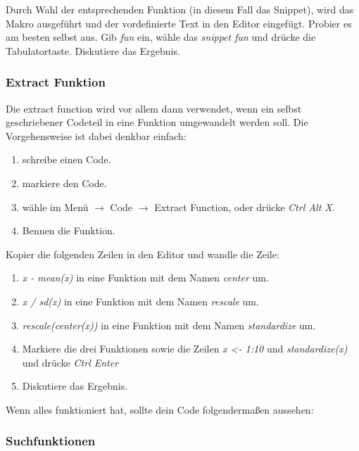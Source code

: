 \documentclass[]{article}
\providecommand{\tightlist}{%
  \setlength{\itemsep}{0pt}\setlength{\parskip}{0pt}}
\begin{document}
Durch Wahl der entsprechenden Funktion (in diesem Fall das Snippet),
wird das Makro ausgeführt und der vordefinierte Text in den Editor
eingefügt. Probier es am besten selbst aus. Gib \emph{fun} ein, wähle
das \emph{snippet fun} und drücke die Tabulatortaste. Diskutiere das
Ergebnis.

\subsubsection*{Extract Funktion}\label{extract-funktion}

Die extract function wird vor allem dann verwendet, wenn ein selbst
geschriebener Codeteil in eine Funktion umgewandelt werden soll. Die
Vorgehensweise ist dabei denkbar einfach:

\begin{enumerate}
\def\labelenumi{\arabic{enumi}.}
\tightlist
\item
  schreibe einen Code.
\item
  markiere den Code.
\item
  wähle im Menü \(\rightarrow\) Code \(\rightarrow\) Extract Function,
  oder drücke \emph{Ctrl Alt X}.
\item
  Bennen die Funktion.
\end{enumerate}

Kopier die folgenden Zeilen in den Editor und wandle die Zeile:

\begin{enumerate}
\def\labelenumi{\arabic{enumi}.}
\tightlist
\item
  \emph{x - mean(x)} in eine Funktion mit dem Namen \emph{center} um.
\item
  \emph{x / sd(x)} in eine Funktion mit dem Namen \emph{rescale} um.
\item
  \emph{rescale(center(x))} in eine Funktion mit dem Namen
  \emph{standardize} um.
\item
  Markiere die drei Funktionen sowie die Zeilen \emph{x \textless{}-
  1:10} und \emph{standardize(x)} und drücke \emph{Ctrl Enter}
\item
  Diskutiere das Ergebnis.
\end{enumerate}

Wenn alles funktioniert hat, sollte dein Code folgendermaßen aussehen:

\subsubsection*{Suchfunktionen}\label{suchfunktionen}
\end{document}
